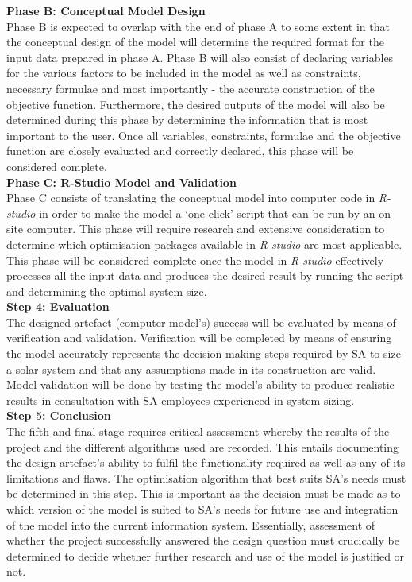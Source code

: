 \documentclass[a4paper,11pt,fleqn]{report}
\begin{document}
\indent\textbf{Phase B: Conceptual Model Design}\label{Phase B: Conceptual Model Design}\\
Phase B is expected to overlap with the end of phase A to some extent in that the conceptual design of the model will determine the required format for the input data prepared in phase A. Phase B will also consist of declaring variables for the various factors to be included in the model as well as constraints, necessary formulae and most importantly - the accurate construction of the objective function. Furthermore, the desired outputs of the model will also be determined during this phase by determining the information that is most important to the user. Once all variables, constraints, formulae and the objective function are closely evaluated and correctly declared, this phase will be considered complete.\\

\indent\textbf{Phase C: R-Studio Model and Validation}\label{Phase C: R-Studio Model Construction}\\
Phase C consists of translating the conceptual model into computer code in \textit{R-studio} in order to make the model a `one-click' script that can be run by an on-site computer. This phase will require research and extensive consideration to determine which optimisation packages available in \textit{R-studio} are most applicable. This phase will be considered complete once the model in \textit{R-studio} effectively processes all the input data and produces the desired result by running the script and determining the optimal system size.\\

\textbf{Step 4: Evaluation}\\
The designed artefact (computer model's) success will be evaluated by means of verification and validation. Verification will be completed by means of ensuring the model accurately represents the decision making steps required by \ac{SA} to size a solar system and that any assumptions made in its construction are valid. Model validation will be done by testing the model's ability to produce realistic results in consultation with \ac{SA} employees experienced in system sizing.\\

\textbf{Step 5: Conclusion}\\
The fifth and final stage requires critical assessment whereby the results of the project and the different algorithms used are recorded. This entails documenting the design artefact's ability to fulfil the functionality required as well as any of its limitations and flaws. The optimisation algorithm that best suits \ac{SA}'s needs must be determined in this step. This is important as the decision must be made as to which version of the model is suited to \ac{SA}'s needs for future use and integration of the model into the current information system. Essentially, assessment of whether the project successfully answered the design question must crucically be determined to decide whether further research and use of the model is justified or not.\\
\end{document}
